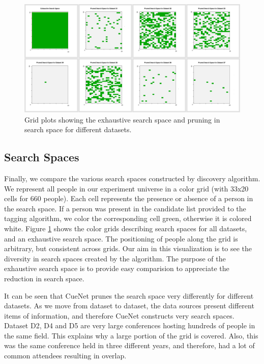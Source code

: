 \begin{figure}[t]
\centering
\includegraphics[width=\textwidth]{diversity/montage-clean-pruned-labelled.png}
\caption{Grid plots showing the exhaustive search space and pruning in search space for different datasets.}
\label{fig:diversity}
\end{figure}

\subsection{Search Spaces}
Finally, we compare the various search spaces constructed by discovery algorithm. We represent all people in our experiment universe in a color grid (with 33x20 cells for 660 people). Each cell represents the presence or absence of a person in the search space. If a person was present in the candidate list provided to the tagging algorithm, we color the corresponding cell green, otherwise it is colored white. Figure \ref{fig:diversity} shows the color grids describing search spaces for all datasets, and an exhaustive search space. The positioning of people along the grid is arbitrary, but consistent across grids. Our aim in this visualization is to see the diversity in search spaces created by the algorithm. The purpose of the exhaustive search space is to provide easy comparision to appreciate the reduction in search space. 

It can be seen that CueNet prunes the search space very differently for different datasets. As we move from dataset to dataset, the data sources present different items of information, and therefore CueNet constructs very search spaces. Dataset D2, D4 and D5 are very large conferences hosting hundreds of people in the same field. This explains why a large portion of the grid is covered. Also, this was the same conference held in three different years, and therefore, had a lot of common attendees resulting in overlap.

